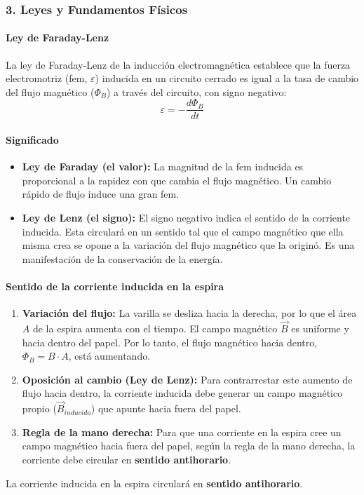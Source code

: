 \subsubsection*{3. Leyes y Fundamentos Físicos}
\paragraph{Ley de Faraday-Lenz}
La ley de Faraday-Lenz de la inducción electromagnética establece que la fuerza electromotriz (fem, $\varepsilon$) inducida en un circuito cerrado es igual a la tasa de cambio del flujo magnético ($\Phi_B$) a través del circuito, con signo negativo:
$$ \varepsilon = - \frac{d\Phi_B}{dt} $$
\paragraph{Significado}
\begin{itemize}
    \item \textbf{Ley de Faraday (el valor):} La magnitud de la fem inducida es proporcional a la rapidez con que cambia el flujo magnético. Un cambio rápido de flujo induce una gran fem.
    \item \textbf{Ley de Lenz (el signo):} El signo negativo indica el sentido de la corriente inducida. Esta circulará en un sentido tal que el campo magnético que ella misma crea se opone a la variación del flujo magnético que la originó. Es una manifestación de la conservación de la energía.
\end{itemize}
\paragraph{Sentido de la corriente inducida en la espira}
\begin{enumerate}
    \item \textbf{Variación del flujo:} La varilla se desliza hacia la derecha, por lo que el área $A$ de la espira aumenta con el tiempo. El campo magnético $\vec{B}$ es uniforme y hacia dentro del papel. Por lo tanto, el flujo magnético hacia dentro, $\Phi_B = B \cdot A$, está aumentando.
    \item \textbf{Oposición al cambio (Ley de Lenz):} Para contrarrestar este aumento de flujo hacia dentro, la corriente inducida debe generar un campo magnético propio ($\vec{B}_{inducido}$) que apunte hacia fuera del papel.
    \item \textbf{Regla de la mano derecha:} Para que una corriente en la espira cree un campo magnético hacia fuera del papel, según la regla de la mano derecha, la corriente debe circular en \textbf{sentido antihorario}.
\end{enumerate}
\begin{cajaresultado}
La corriente inducida en la espira circulará en \textbf{sentido antihorario}.
\end{cajaresultado}
